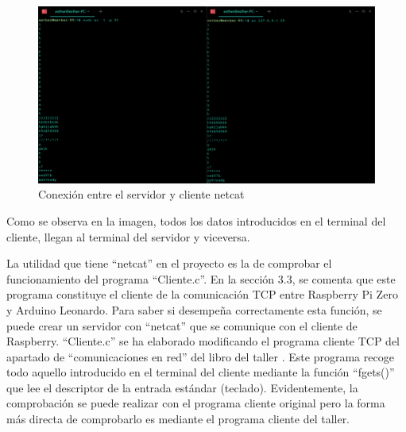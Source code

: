     \begin{figure}
    \centering
    \includegraphics[scale = 0.3]{anexo_b/figuras_dir/csnetcat.jpg}
    \caption{Conexión entre el servidor y cliente netcat}
    \end{figure}
    
Como se observa en la imagen, todos los datos introducidos en el terminal del cliente, llegan al terminal del servidor y viceversa.

La utilidad que tiene ``netcat'' en el proyecto es la de comprobar el funcionamiento del programa ``Cliente.c''. En la sección 3.3, se comenta que este programa constituye el cliente de la comunicación TCP entre Raspberry Pi Zero y Arduino Leonardo. Para saber si desempeña correctamente esta función, se puede crear un servidor con ``netcat'' que se comunique con el cliente de Raspberry. ``Cliente.c'' se ha elaborado modificando el programa cliente TCP del apartado de ``comunicaciones en red'' del libro del taller \citep{franciscoTCP}. Este programa recoge todo aquello introducido en el terminal del cliente mediante la función ``fgets()'' que lee el descriptor de la entrada estándar (teclado). Evidentemente, la comprobación se puede realizar con el programa cliente original pero la forma más directa de comprobarlo es mediante el programa cliente del taller.


